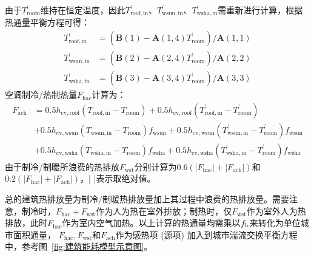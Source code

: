 由于$T_{\mathrm{room}}^\prime$维持在恒定温度，因此$T_{\mathrm{roof,in}}^\prime$、$T_{\mathrm{wsun,in}}^\prime$、$T_{\mathrm{wsha,in}}^\prime$需重新进行计算，根据热通量平衡方程可得：
\begin{equation}
  \begin{aligned}
    T_{\mathrm{roof,in}}^\prime & = \left ( \mathbf{B}\left(1\right)-\mathbf{A}\left(1,4\right)T_{\mathrm{room}}^\prime\right) / \mathbf{A}\left(1,1\right) \\
    T_{\mathrm{wsun,in}}^\prime & = \left ( \mathbf{B}\left(2\right)-\mathbf{A}\left(2,4\right)T_{\mathrm{room}}^\prime\right) / \mathbf{A}\left(2,2\right) \\
    T_{\mathrm{wsha,in}}^\prime & = \left ( \mathbf{B}\left(3\right)-\mathbf{A}\left(3,4\right)T_{\mathrm{room}}^\prime\right) / \mathbf{A}\left(3,3\right)
  \end{aligned}
\end{equation}
空调制冷/热制热量$F_{\mathrm{hac}}$计算为：
\begin{equation}
  \begin{aligned}
    F_{\mathrm{ach}} & = 0.5h_{\mathrm{cv,roof}}\left(T_{\mathrm{roof,in}}-T_{\mathrm{room}}\right) + 0.5h_{\mathrm{cv,roof}}\left(T_{\mathrm{roof,in}}^\prime-T_{\mathrm{room}}^\prime\right) \\
    & + 0.5h_{\mathrm{cv,wsun}}\left(T_{\mathrm{wsun,in}}-T_{\mathrm{room}}\right)f_{\mathrm{wsun}} + 0.5h_{\mathrm{cv,wsun}}\left(T_{\mathrm{wsun,in}}^\prime-T_{\mathrm{room}}^\prime\right)f_{\mathrm{wsun}} \\
    & + 0.5h_{\mathrm{cv,wsha}}\left(T_{\mathrm{wsha,in}}-T_{\mathrm{room}}\right)f_{\mathrm{wsha}} + 0.5h_{\mathrm{cv,wsha}}\left(T_{\mathrm{wsha,in}}^\prime-T_{\mathrm{room}}^\prime\right)f_{\mathrm{wsha}}
  \end{aligned}
\end{equation}
由于制冷/制暖所浪费的热排放$F_{\mathrm{wst}}$分别计算为$0.6\left( |F_{\mathrm{hac}}|+|F_{\mathrm{ach}}|\right)$和$0.2\left( |F_{\mathrm{hac}}|+|F_{\mathrm{ach}}|\right)$，| |表示取绝对值。

总的建筑热排放量为制冷/制暖热排放量加上其过程中浪费的热排放量。需要注意，制冷时，$F_{\mathrm{hac}}+F_{\mathrm{wst}}$作为人为热在室外排放；制热时，仅$F_{\mathrm{wst}}$作为室外人为热排放，此时$F_{\mathrm{hac}}$作为室内空气加热。以上计算的热通量均需乘以$f_{\rm b}$来转化为单位城市面积通量，
$F_{\mathrm{hac}}, F_{\mathrm{wst}}$和$F_{\mathrm{ach}}$作为感热项 (源项) 加入到城市湍流交换平衡方程中，参考图~\ref{fig:建筑能耗模型示意图}。

